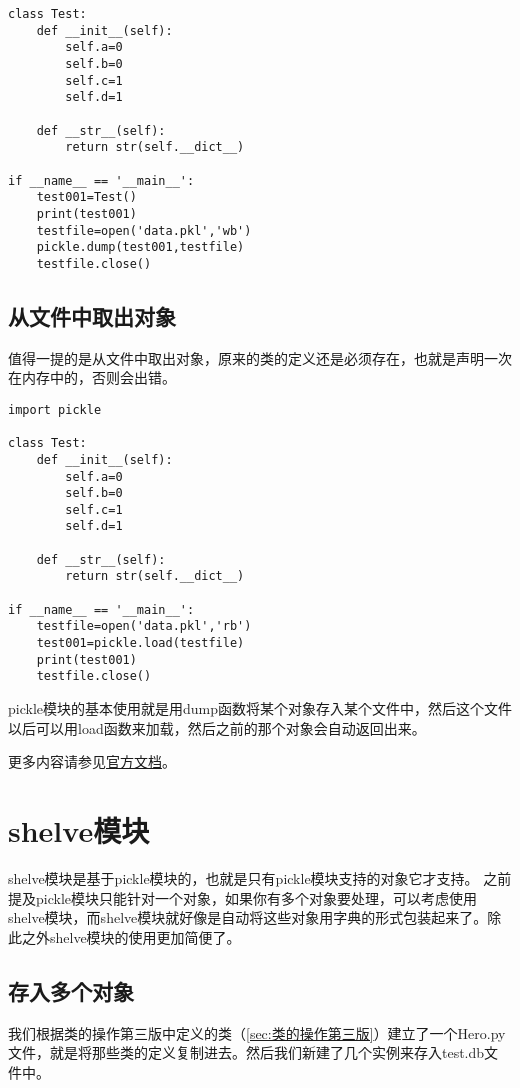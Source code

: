 \documentclass[12pt,oneside]{book}
\begin{document}
\begin{common-format}
\begin{Verbatim}
class Test:
    def __init__(self):
        self.a=0
        self.b=0
        self.c=1
        self.d=1

    def __str__(self):
        return str(self.__dict__)

if __name__ == '__main__':
    test001=Test()
    print(test001)
    testfile=open('data.pkl','wb')
    pickle.dump(test001,testfile)
    testfile.close()
\end{Verbatim}




\section{从文件中取出对象}
值得一提的是从文件中取出对象，原来的类的定义还是必须存在，也就是声明一次在内存中的，否则会出错。
\begin{Verbatim}
import pickle

class Test:
    def __init__(self):
        self.a=0
        self.b=0
        self.c=1
        self.d=1

    def __str__(self):
        return str(self.__dict__)

if __name__ == '__main__':
    testfile=open('data.pkl','rb')
    test001=pickle.load(testfile)
    print(test001)
    testfile.close()
\end{Verbatim}

pickle模块的基本使用就是用dump函数将某个对象存入某个文件中，然后这个文件以后可以用load函数来加载，然后之前的那个对象会自动返回出来。

\begin{Large}
更多内容请参见\href{https://docs.python.org/3/library/pickle.html}{官方文档}。
\end{Large}

\chapter{shelve模块}
shelve模块是基于pickle模块的，也就是只有pickle模块支持的对象它才支持。 之前提及pickle模块只能针对一个对象，如果你有多个对象要处理，可以考虑使用shelve模块，而shelve模块就好像是自动将这些对象用字典的形式包装起来了。除此之外shelve模块的使用更加简便了。

\section{存入多个对象}
我们根据类的操作第三版中定义的类（\ref{sec:类的操作第三版}）建立了一个Hero.py文件，就是将那些类的定义复制进去。然后我们新建了几个实例来存入test.db文件中。


\end{common-format}
\end{document}
